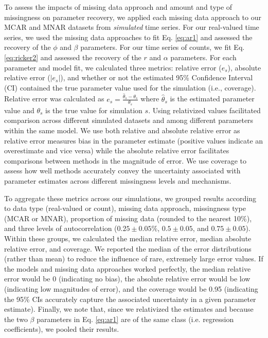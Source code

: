 \documentclass[12pt,english]{article} %
\begin{document}
\begin{linenumbers}
\begin{spacing}{1.9}
\begin{flushleft}
\hspace{1em} To assess the impacts of missing data approach and amount and type of missingness on parameter recovery, we applied each missing data approach to our MCAR and MNAR datasets from \textit{simulated} time series. For our real-valued time series, we used the missing data approaches to fit Eq. \ref{eq:ar1} and assessed the recovery of the $\phi$ and $\beta$ parameters. For our time series of counts, we fit Eq. \ref{eq:ricker2} and assessed the recovery of the $r$ and $\alpha$ parameters. For each parameter and model fit, we calculated three metrics: relative error ($e_s$), absolute relative error ($|e_s|$), and whether or not the estimated 95\% Confidence Interval (CI) contained the true parameter value used for the simulation (i.e., coverage). Relative error was calculated as $e_s = \frac{\hat{\theta}_s - \theta_s}{\theta_s}$ where $\hat \theta_s$ is the estimated parameter value and $\theta_s$ is the true value for simulation $s$. Using relativized values facilitated comparison across different simulated datasets and among different parameters within the same model. We use both relative and absolute relative error as relative error measures bias in the parameter estimate (positive values indicate an overestimate and vice versa) while the absolute relative error facilitates comparisons between methods in the magnitude of error. We use coverage to assess how well methods accurately convey the uncertainty associated with parameter estimates across different missingness levels and mechanisms.

\hspace{1em} To aggregate these metrics across our simulations, we grouped results according to data type (real-valued or count), missing data approach, missingness type (MCAR or MNAR), proportion of missing data (rounded to the nearest 10\%), and three levels of autocorrelation ($0.25 \pm 0.05\%$, $0.5\pm0.05$, and $0.75\pm0.05$). Within these groups, we calculated the median relative error, median absolute relative error, and coverage. We reported the median of the error distributions (rather than mean) to reduce the influence of rare, extremely large error values. If the models and missing data approaches worked perfectly, the median relative error would be 0 (indicating no bias), the absolute relative error would be low (indicating low magnitudes of error), and the coverage would be 0.95 (indicating the 95\% CIs accurately capture the associated uncertainty in a given parameter estimate). Finally, we note that, since we relativized the estimates and because the two $\beta$ parameters in Eq. \ref{eq:ar1} are of the same class (i.e. regression coefficients), we pooled their results.


\end{flushleft}
\end{spacing}
\end{linenumbers}
\end{document}
